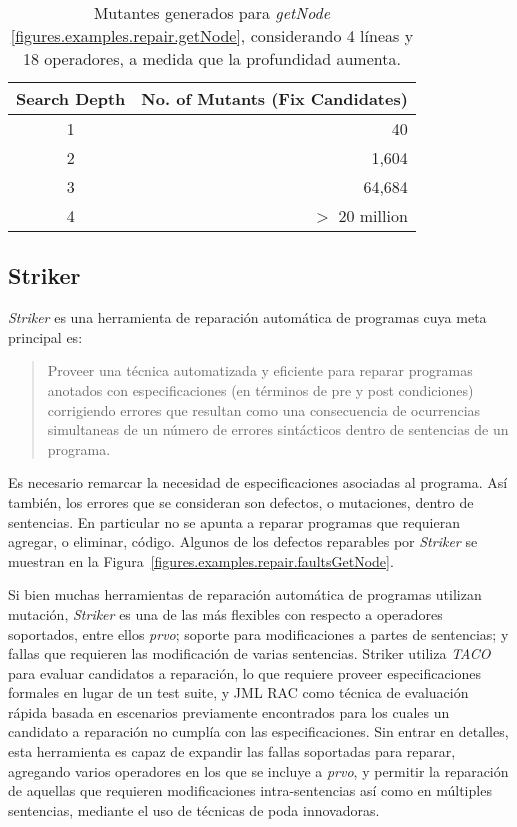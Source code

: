 \begin{table}[t]
	\begin{center}
		\small
		\begin{tabular}{c r}
			Search Depth                            &	No. of Mutants (Fix Candidates)        \\
			\hline
			1 					&	40		                               	\\
			2 					&	1,604			                \\
			3 					&	64,684		        	        \\
			4 					&	$>$ 20 million		                
		\end{tabular}
		\normalsize
	\end{center}
	\caption{Mutantes generados para \emph{getNode} \ref{figures.examples.repair.getNode}, considerando 4 l\'ineas y 18 operadores, a medida que la profundidad aumenta.}
	\label{tables.repair.mutation.explosion}
\end{table}

\pagebreak
\subsection{Striker}
\label{sec:repair.striker}

\emph{Striker} es una herramienta de reparaci\'on autom\'atica de programas cuya meta principal es:
\begin{quote}
	Proveer una t\'ecnica automatizada y eficiente para reparar programas anotados con especificaciones (en t\'erminos de pre y post condiciones) corrigiendo errores que resultan como una consecuencia de ocurrencias simultaneas de un n\'umero de errores sint\'acticos dentro de sentencias de un programa.
\end{quote}
Es necesario remarcar la necesidad de especificaciones asociadas al programa. As\'i tambi\'en, los errores que se consideran son defectos, o mutaciones, dentro de sentencias. En particular no se apunta a reparar programas que requieran agregar, o eliminar, c\'odigo. Algunos de los defectos reparables por \emph{Striker} se muestran en la Figura~\ref{figures.examples.repair.faultsGetNode}.

Si bien muchas herramientas de reparaci\'on autom\'atica de programas utilizan mutaci\'on, \emph{Striker} es una de las m\'as flexibles con respecto a operadores soportados, entre ellos \emph{prvo}; soporte para modificaciones a partes de sentencias; y fallas que requieren las modificaci\'on de varias sentencias. Striker utiliza \emph{TACO} \cite{bibliography.mutation.tools.TACOGaleottiRPF13} para evaluar candidatos a reparaci\'on, lo que requiere proveer especificaciones formales en lugar de un test suite, y JML RAC \cite{bibliography.misc.JMLRAC.LeavensCCRC02} como t\'ecnica de evaluaci\'on r\'apida basada en escenarios previamente encontrados para los cuales un candidato a reparaci\'on no cumpl\'ia con las especificaciones. Sin entrar en detalles, esta herramienta es capaz de expandir las fallas soportadas para reparar, agregando varios operadores en los que se incluye a \emph{prvo}, y permitir la reparaci\'on de aquellas que requieren modificaciones intra-sentencias as\'i como en m\'ultiples sentencias, mediante el uso de t\'ecnicas de poda innovadoras.

